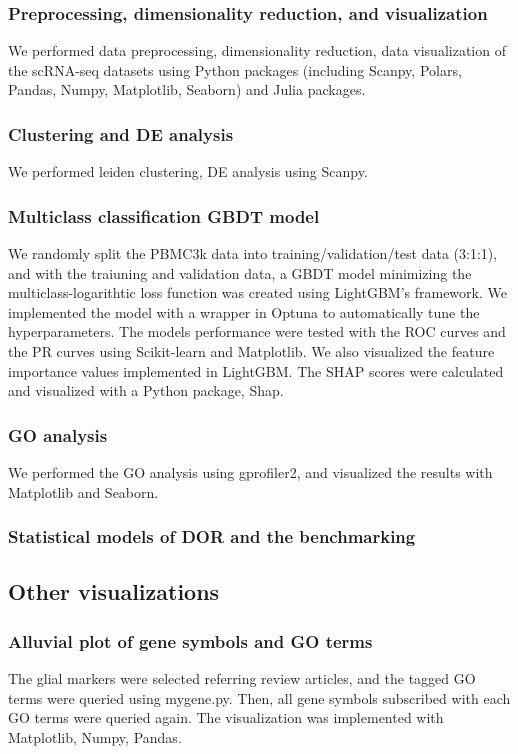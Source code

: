 \documentclass{article}
\begin{document}
\subsubsection*{Preprocessing, dimensionality reduction, and visualization}
We performed data preprocessing, dimensionality reduction, data visualization
of the scRNA-seq datasets using Python packages (including Scanpy\cite{scanpy}, Polars,
Pandas\cite{pandas}, Numpy, Matplotlib\cite{matplotlib}, Seaborn\cite{seaborn}) and Julia packages.

\subsubsection*{Clustering and DE analysis}
We performed leiden clustering, DE analysis using Scanpy.

\subsubsection*{Multiclass classification GBDT model}
We randomly split the PBMC3k data into training/validation/test data (3:1:1), and with the traiuning and validation 
data, a GBDT model minimizing the multiclass-logarithtic loss function was created using LightGBM's 
framework. We implemented the model with a wrapper in Optuna to automatically tune the hyperparameters. The 
models performance were tested with the ROC curves and the PR curves using Scikit-learn and Matplotlib. We 
also visualized the feature importance values implemented in LightGBM. The SHAP scores were calculated and visualized 
with a Python package, Shap\cite{shap,shap_treeexplainer}.

\subsubsection*{GO analysis}
We performed the GO analysis using gprofiler2\cite{gprofiler2}, and visualized the results with Matplotlib and Seaborn.

\subsubsection*{Statistical models of DOR and the benchmarking}

\subsection*{Other visualizations}
\subsubsection*{Alluvial plot of gene symbols and GO terms}
The glial markers were selected referring review articles, and the tagged GO terms were queried using mygene.py. 
Then, all gene symbols subscribed with each GO terms were queried again. The visualization was implemented 
with Matplotlib, Numpy, Pandas.
\end{document}
